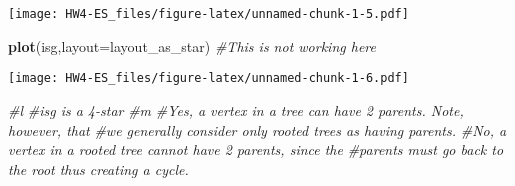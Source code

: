\documentclass[
]{article}
\newenvironment{Shaded}{\begin{snugshade}}{\end{snugshade}}
\newcommand{\CommentTok}[1]{\textcolor[rgb]{0.56,0.35,0.01}{\textit{#1}}}
\newcommand{\DataTypeTok}[1]{\textcolor[rgb]{0.13,0.29,0.53}{#1}}
\newcommand{\KeywordTok}[1]{\textcolor[rgb]{0.13,0.29,0.53}{\textbf{#1}}}
\newcommand{\NormalTok}[1]{#1}
\begin{document}
\texttt{[image: HW4-ES\_files/figure-latex/unnamed-chunk-1-5.pdf]}

\begin{Shaded}
\begin{Highlighting}[]
\KeywordTok{plot}\NormalTok{(isg,}\DataTypeTok{layout=}\NormalTok{layout_as_star) }\CommentTok{#This is not working here}
\end{Highlighting}
\end{Shaded}

\texttt{[image: HW4-ES\_files/figure-latex/unnamed-chunk-1-6.pdf]}

\begin{Shaded}
\begin{Highlighting}[]
\CommentTok{#l}
\CommentTok{#isg is a 4-star}
\CommentTok{#m}
\CommentTok{#Yes, a vertex in a tree can have 2 parents. Note, however, that}
\CommentTok{#we generally consider only rooted trees as having parents.}
\CommentTok{#No, a vertex in a rooted tree cannot have 2 parents, since the }
\CommentTok{#parents must go back to the root thus creating a cycle.}
\end{Highlighting}
\end{Shaded}
\end{document}

